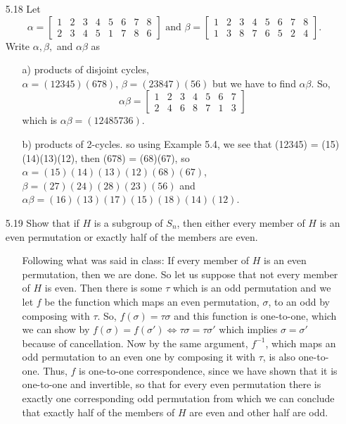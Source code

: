 \documentclass[12pt]{article}
\begin{document}
\begin{enumerate}
\item[5.18] Let 
\[
\alpha = 
\left[
\begin{array}{cccccccc} 
1 & 2 & 3 & 4 & 5 & 6 & 7 & 8\\
2 & 3 & 4 & 5 & 1 & 7 & 8 & 6
\end{array}
\right]
\mbox{ and } 
\beta = 
\left[
\begin{array}{cccccccc} 
1 & 2 & 3 & 4 & 5 & 6 & 7 & 8\\
1 & 3 & 8 & 7 & 6 & 5 & 2 & 4
\end{array}
\right].
\]
Write $\alpha, \beta,$ and $\alpha \beta$ as
\begin{enumerate}
\item[a)] products of disjoint cycles,\\
$\alpha = (12345)(678)$, $\beta = (23847)(56)$ but we
have to find $\alpha \beta$. So, 
\[
\alpha \beta = 
\left[
\begin{array}{ccccccc}
1 & 2 & 3 & 4 & 5 & 6 & 7 \\
2 & 4 & 6 & 8 & 7 & 1 & 3
\end{array}
\right]
\]
which is $\alpha \beta = (12485736)$.
\item[b)] products of 2-cycles.
so using Example 5.4, we see that 
(12345) = (15)(14)(13)(12), then (678) = (68)(67), so
$\alpha = (15)(14)(13)(12)(68)(67)$, \\
$\beta = (27)(24)(28)(23)(56)$ and 
$\alpha \beta = (16)(13)(17)(15)(18)(14)(12)$.
\end{enumerate}

\item[5.19] Show that if $H$ is a subgroup of $S_n$, then either every member of $H$
is an even permutation or exactly half of the members are even.
\begin{enumerate}
\item[] Following what was said in class: If every member of $H$ is an even permutation, then
we are done. So let us suppose that not every member of $H$ is even. Then there is some 
$\tau$ which is an odd permutation and we let $f$ be the function which maps an 
even permutation, $\sigma$, to an odd by composing with $\tau$. So, 
$f(\sigma) = \tau\sigma$ and this function is one-to-one, which we can show by 
$f(\sigma) = f(\sigma') \Leftrightarrow \tau\sigma = \tau\sigma'$ which implies 
$\sigma = \sigma'$ because of cancellation. Now by the same argument, $f^{-1}$, which maps an odd 
permutation to an even one by composing it with $\tau$, is also one-to-one. Thus, $f$ is
one-to-one correspondence, since we have shown that it is one-to-one and invertible, so that for every even 
permutation there is exactly one corresponding odd permutation from which we can conclude that 
exactly half of the members of $H$ are even and other half are odd.
\end{enumerate}


\end{enumerate}
\end{document}
